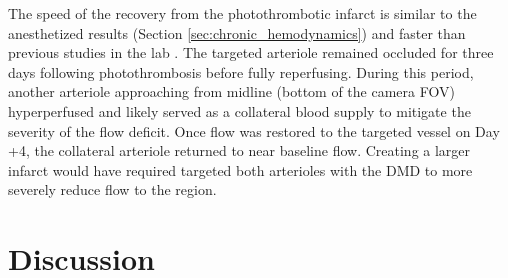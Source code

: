 The speed of the recovery from the photothrombotic infarct is similar to the anesthetized results (Section \ref{sec:chronic_hemodynamics}) and faster than previous studies in the lab \cite{Schrandt:2015gu}. The targeted arteriole remained occluded for three days following photothrombosis before fully reperfusing. During this period, another arteriole approaching from midline (bottom of the camera FOV) hyperperfused and likely served as a collateral blood supply to mitigate the severity of the flow deficit. Once flow was restored to the targeted vessel on Day +4, the collateral arteriole returned to near baseline flow. Creating a larger infarct would have required targeted both arterioles with the DMD to more severely reduce flow to the region.



\section{Discussion}

\blindtext



